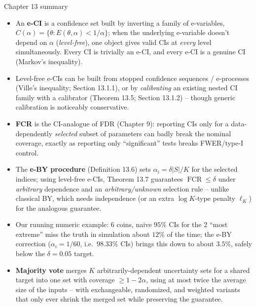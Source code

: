 \documentclass[aspectratio=169,10pt]{beamer}
\DeclareMathOperator{\FCR}{FCR}
\begin{document}
\begin{frame}[allowframebreaks]{Chapter 13 summary}
  \begin{itemize}
    \item An \textbf{e-CI} is a confidence set built by inverting a family of e-variables, $C(\alpha)=\{\theta : E(\theta,\alpha)<1/\alpha\}$; when the underlying e-variable doesn't depend on $\alpha$ (\emph{level-free}), one object gives valid CIs at \emph{every} level simultaneously. Every CI is trivially an e-CI, and every e-CI is a genuine CI (Markov's inequality).
    \item Level-free e-CIs can be built from stopped confidence sequences / e-processes (Ville's inequality; Section 13.1.1), or by \emph{calibrating} an existing nested CI family with a calibrator (Theorem 13.5; Section 13.1.2) -- though generic calibration is noticeably conservative.
    \item \textbf{FCR} is the CI-analogue of FDR (Chapter 9): reporting CIs only for a data-dependently \emph{selected} subset of parameters can badly break the nominal coverage, exactly as reporting only ``significant'' tests breaks FWER/type-I control.
    \item The \textbf{e-BY procedure} (Definition 13.6) sets $\alpha_i=\delta|S|/K$ for the selected indices; using level-free e-CIs, Theorem 13.7 guarantees $\FCR\le\delta$ under \emph{arbitrary} dependence and an \emph{arbitrary/unknown} selection rule -- unlike classical BY, which needs independence (or an extra $\log K$-type penalty $\ell_K$) for the analogous guarantee.
    \item Our running numeric example: $6$ coins, naive $95\%$ CIs for the $2$ ``most extreme'' miss the truth in simulation about $12\%$ of the time; the e-BY correction ($\alpha_i=1/60$, i.e.\ $98.33\%$ CIs) brings this down to about $3.5\%$, safely below the $\delta=0.05$ target.
    \item \textbf{Majority vote} merges $K$ arbitrarily-dependent uncertainty sets for a shared target into one set with coverage $\geq1-2\alpha$, using at most twice the average size of the inputs -- with exchangeable, randomized, and weighted variants that only ever shrink the merged set while preserving the guarantee.
  \end{itemize}
\end{frame}
\end{document}
